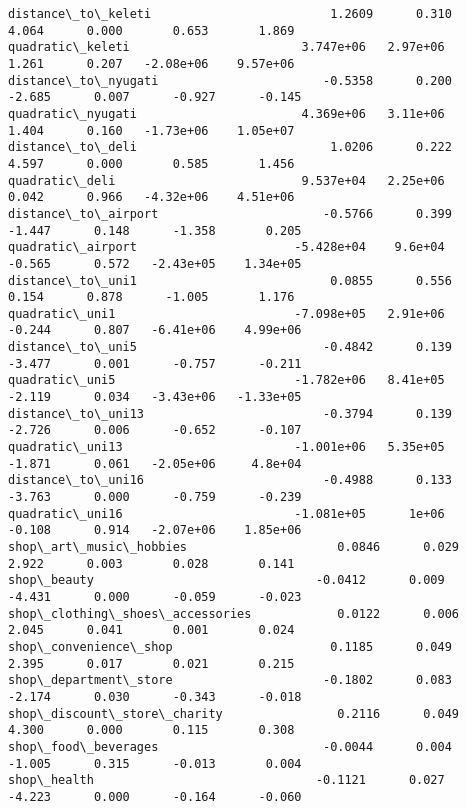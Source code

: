 \documentclass[11pt]{article}
\begin{document}
\begin{Verbatim}[commandchars=\\\{\}]
distance\_to\_keleti                         1.2609      0.310      4.064      0.000       0.653       1.869
quadratic\_keleti                        3.747e+06   2.97e+06      1.261      0.207   -2.08e+06    9.57e+06
distance\_to\_nyugati                       -0.5358      0.200     -2.685      0.007      -0.927      -0.145
quadratic\_nyugati                       4.369e+06   3.11e+06      1.404      0.160   -1.73e+06    1.05e+07
distance\_to\_deli                           1.0206      0.222      4.597      0.000       0.585       1.456
quadratic\_deli                          9.537e+04   2.25e+06      0.042      0.966   -4.32e+06    4.51e+06
distance\_to\_airport                       -0.5766      0.399     -1.447      0.148      -1.358       0.205
quadratic\_airport                      -5.428e+04    9.6e+04     -0.565      0.572   -2.43e+05    1.34e+05
distance\_to\_uni1                           0.0855      0.556      0.154      0.878      -1.005       1.176
quadratic\_uni1                         -7.098e+05   2.91e+06     -0.244      0.807   -6.41e+06    4.99e+06
distance\_to\_uni5                          -0.4842      0.139     -3.477      0.001      -0.757      -0.211
quadratic\_uni5                         -1.782e+06   8.41e+05     -2.119      0.034   -3.43e+06   -1.33e+05
distance\_to\_uni13                         -0.3794      0.139     -2.726      0.006      -0.652      -0.107
quadratic\_uni13                        -1.001e+06   5.35e+05     -1.871      0.061   -2.05e+06     4.8e+04
distance\_to\_uni16                         -0.4988      0.133     -3.763      0.000      -0.759      -0.239
quadratic\_uni16                        -1.081e+05      1e+06     -0.108      0.914   -2.07e+06    1.85e+06
shop\_art\_music\_hobbies                     0.0846      0.029      2.922      0.003       0.028       0.141
shop\_beauty                               -0.0412      0.009     -4.431      0.000      -0.059      -0.023
shop\_clothing\_shoes\_accessories            0.0122      0.006      2.045      0.041       0.001       0.024
shop\_convenience\_shop                      0.1185      0.049      2.395      0.017       0.021       0.215
shop\_department\_store                     -0.1802      0.083     -2.174      0.030      -0.343      -0.018
shop\_discount\_store\_charity                0.2116      0.049      4.300      0.000       0.115       0.308
shop\_food\_beverages                       -0.0044      0.004     -1.005      0.315      -0.013       0.004
shop\_health                               -0.1121      0.027     -4.223      0.000      -0.164      -0.060

\end{Verbatim}
\end{document}
